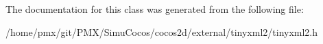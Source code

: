 The documentation for this class was generated from the following file\+:\begin{DoxyCompactItemize}
\item 
/home/pmx/git/\+P\+M\+X/\+Simu\+Cocos/cocos2d/external/tinyxml2/tinyxml2.\+h\end{DoxyCompactItemize}
